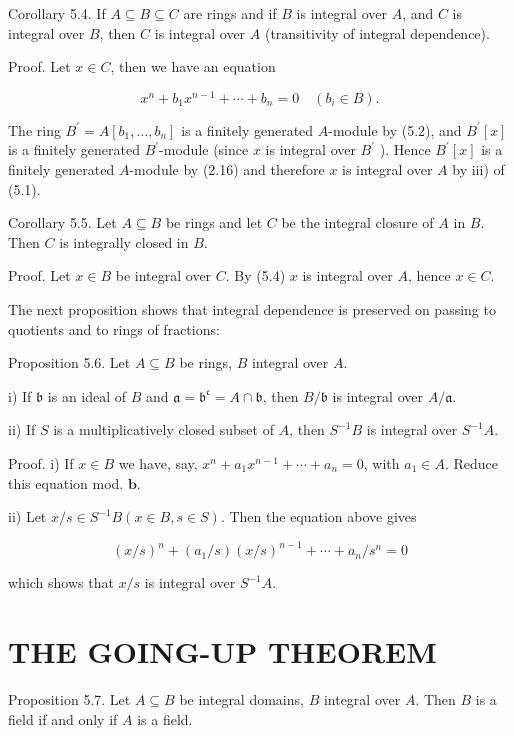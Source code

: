 \documentclass{standalone}
\theoremstyle{definition}
\theoremstyle{remark}
\begin{document}
Corollary 5.4. If $A \subseteq B \subseteq C$ are rings and if $B$ is integral over $A$, and $C$ is integral over $B$, then $C$ is integral over $A$ (transitivity of integral dependence).

Proof. Let $x \in C$, then we have an equation

\[
x^{n}+b_{1} x^{n-1}+\cdots+b_{n}=0 \quad\left(b_{i} \in B\right) .
\]

The ring $B^{\prime}=A\left[b_{1}, \ldots, b_{n}\right]$ is a finitely generated $A$-module by (5.2), and $B^{\prime}[x]$ is a finitely generated $B^{\prime}$-module (since $x$ is integral over $B^{\prime}$ ). Hence $B^{\prime}[x]$ is a finitely generated $A$-module by (2.16) and therefore $x$ is integral over $A$ by iii) of (5.1).

Corollary 5.5. Let $A \subseteq B$ be rings and let $C$ be the integral closure of $A$ in $B$. Then $C$ is integrally closed in $B$.

Proof. Let $x \in B$ be integral over $C$. By (5.4) $x$ is integral over $A$, hence $x \in C$.

The next proposition shows that integral dependence is preserved on passing to quotients and to rings of fractions:

Proposition 5.6. Let $A \subseteq B$ be rings, $B$ integral over $A$.

i) If $\mathfrak{b}$ is an ideal of $B$ and $\mathfrak{a}=\mathfrak{b}^{\mathfrak{c}}=A \cap \mathfrak{b}$, then $B / \mathfrak{b}$ is integral over $A / \mathfrak{a}$.

ii) If $S$ is a multiplicatively closed subset of $A$, then $S^{-1} B$ is integral over $S^{-1} A$.

Proof. i) If $x \in B$ we have, say, $x^{n}+a_{1} x^{n-1}+\cdots+a_{n}=0$, with $a_{1} \in A$. Reduce this equation mod. $\boldsymbol{b}$.

ii) Let $x / s \in S^{-1} B(x \in B, s \in S)$. Then the equation above gives

\[
(x / s)^{n}+\left(a_{1} / s\right)(x / s)^{n-1}+\cdots+a_{n} / s^{n}=0
\]

which shows that $x / s$ is integral over $S^{-1} A$.

\section{THE GOING-UP THEOREM}
Proposition 5.7. Let $A \subseteq B$ be integral domains, $B$ integral over $A$. Then $B$ is a field if and only if $A$ is a field.
\end{document}
